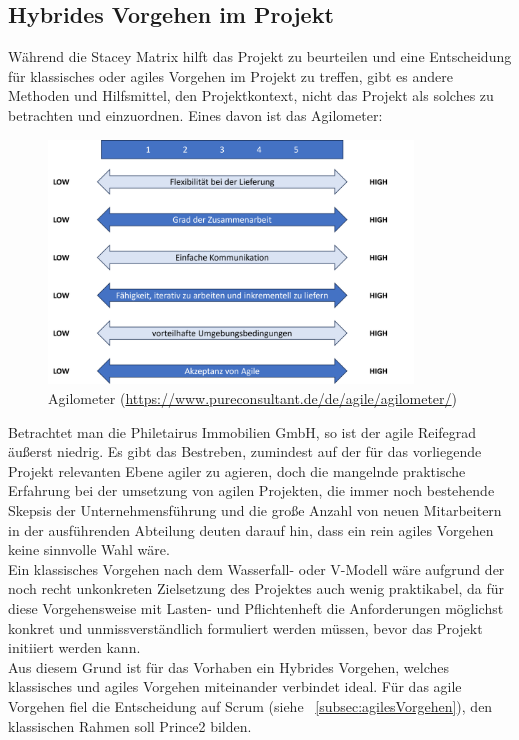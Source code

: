 \subsection{Hybrides Vorgehen im Projekt}

Während die Stacey Matrix hilft das Projekt zu beurteilen und eine Entscheidung für klassisches oder agiles Vorgehen im Projekt zu treffen, gibt es andere Methoden und Hilfsmittel, den Projektkontext, nicht das Projekt als solches zu betrachten und einzuordnen. Eines davon ist das Agilometer:\\

\begin{figure}[hbt!]
\centering
\includegraphics[width=9.69cm, height=6.48cm]{Agilometer}
\caption{Agilometer (\url{https://www.pureconsultant.de/de/agile/agilometer/})}
\end{figure}

Betrachtet man die Philetairus Immobilien GmbH, so ist der agile Reifegrad äußerst niedrig. Es gibt das Bestreben, zumindest auf der für das vorliegende Projekt relevanten Ebene agiler zu agieren, doch die mangelnde praktische Erfahrung bei der umsetzung von agilen Projekten, die immer noch bestehende Skepsis der Unternehmensführung und die große Anzahl von neuen Mitarbeitern in der ausführenden Abteilung deuten darauf hin, dass ein rein agiles Vorgehen keine sinnvolle Wahl wäre.\\

Ein klassisches Vorgehen nach dem Wasserfall- oder V-Modell wäre aufgrund der noch recht unkonkreten Zielsetzung des Projektes auch wenig praktikabel, da für diese Vorgehensweise mit Lasten- und Pflichtenheft die Anforderungen möglichst konkret und unmissverständlich formuliert werden müssen, bevor das Projekt initiiert werden kann.\\

Aus diesem Grund ist für das Vorhaben ein Hybrides Vorgehen, welches klassisches und agiles Vorgehen miteinander verbindet ideal. Für das agile Vorgehen fiel die Entscheidung auf Scrum (siehe ~\ref{subsec:agilesVorgehen}), den klassischen Rahmen soll Prince2 bilden.\\

